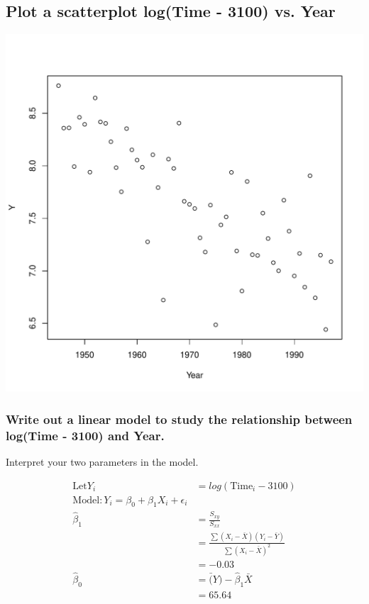 \documentclass[11pt]{article}
\begin{document}
\subsection{Plot a scatterplot log(Time - 3100) vs. Year}
\label{sec-3-3}



\includegraphics[width=.9\linewidth]{prob2b.pdf}
\subsubsection{Write out a linear model to study the relationship between log(Time - 3100) and Year.}
\label{sec-3-3-1}

Interpret your two parameters in the model.

\begin{align*}
\mathrm{Let} Y_i &= log(\mathrm{Time}_i -3100)\\
\mathrm{Model:} Y_i = \beta_0 + \beta_1 X_i + \epsilon_i\\
\hat{\beta}_1 &= \frac{S_{xy}}{S_{xx}} \\
              &=\frac{ \sum (X_i - \bar{X})(Y_i - \bar{Y})}{\sum (X_i - \bar{X})^2}\\
              &= -0.03\\
\hat{\beta}_{0} &= \bar(Y) - \hat{\beta}_{1}\bar{X}\\
              &= 65.64
\end{align*}
\end{document}

